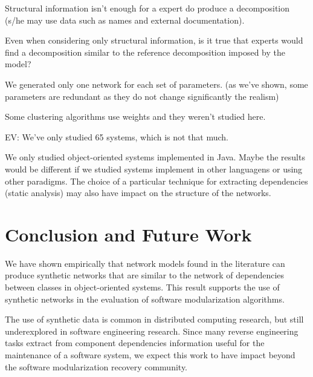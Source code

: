 Structural information isn't enough for a expert do produce a
decomposition (s/he may use data such as names and external documentation). 

Even when considering only structural information, is it true
that experts would find a decomposition similar to the reference decomposition
imposed by the model?

We generated only one network for each set of parameters. (as we've shown, some
parameters are redundant as they do not change significantly the realism)

Some clustering algorithms use weights and they weren't studied here.

EV: We've only studied 65 systems, which is not that much.

We only studied object-oriented systems implemented in Java. Maybe the results
would be different if we studied systems implement in other languagens or using
other paradigms. The choice of a particular technique for extracting
dependencies (static analysis) may also have impact on the structure of the
networks.


\section{Conclusion and Future Work}

We have shown empirically that network models found in the literature can
produce synthetic networks that are similar to the network of dependencies
between classes in object-oriented systems. This result supports the use of
synthetic networks in the evaluation of software modularization algorithms.

The use of synthetic data is common in distributed computing research, but still
underexplored in software engineering research. Since many reverse engineering
tasks extract from component dependencies information useful for the maintenance
of a software system, we expect this work to have impact beyond the software
modularization recovery community.



